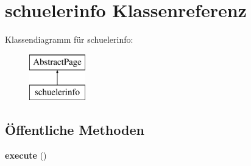 \hypertarget{classschuelerinfo}{}\section{schuelerinfo Klassenreferenz}
\label{classschuelerinfo}
Klassendiagramm für schuelerinfo\+:\begin{figure}[H]
\begin{center}
\leavevmode
\includegraphics[height=2.000000cm]{classschuelerinfo}
\end{center}
\end{figure}
\subsection*{Öffentliche Methoden}
\begin{DoxyCompactItemize}
\item 
\mbox{\label{classschuelerinfo_aba0bf7c29f9dba117dd104f062e8d1f8}} 
{\bfseries execute} ()
\end{DoxyCompactItemize}
